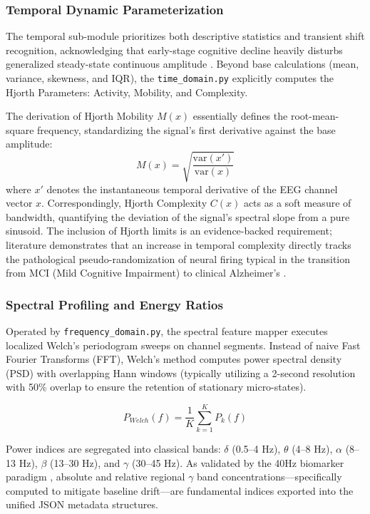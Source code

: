 \subsubsection{Temporal Dynamic Parameterization}
The temporal sub-module prioritizes both descriptive statistics and transient shift recognition, acknowledging that early-stage cognitive decline heavily disturbs generalized steady-state continuous amplitude \cite{jeong2004eeg}. Beyond base calculations (mean, variance, skewness, and IQR), the \texttt{time\_domain.py} explicitly computes the Hjorth Parameters: Activity, Mobility, and Complexity.

The derivation of Hjorth Mobility $M(x)$ essentially defines the root-mean-square frequency, standardizing the signal's first derivative against the base amplitude:
\begin{equation}
    M(x) = \sqrt{\frac{\text{var}(x')}{\text{var}(x)}}
\end{equation}
where $x'$ denotes the instantaneous temporal derivative of the EEG channel vector $x$. 
Correspondingly, Hjorth Complexity $C(x)$ acts as a soft measure of bandwidth, quantifying the deviation of the signal's spectral slope from a pure sinusoid. The inclusion of Hjorth limits is an evidence-backed requirement; literature demonstrates that an increase in temporal complexity directly tracks the pathological pseudo-randomization of neural firing typical in the transition from MCI (Mild Cognitive Impairment) to clinical Alzheimer's \cite{cassani2020review}.

\subsubsection{Spectral Profiling and Energy Ratios}
Operated by \texttt{frequency\_domain.py}, the spectral feature mapper executes localized Welch's periodogram sweeps on channel segments. Instead of naive Fast Fourier Transforms (FFT), Welch's method computes power spectral density (PSD) with overlapping Hann windows (typically utilizing a 2-second resolution with 50\% overlap to ensure the retention of stationary micro-states).

\begin{equation}
    P_{Welch}(f) = \frac{1}{K} \sum_{k=1}^{K} P_k(f)
\end{equation}

Power indices are segregated into classical bands: $\delta$ (0.5--4 Hz), $\theta$ (4--8 Hz), $\alpha$ (8--13 Hz), $\beta$ (13--30 Hz), and $\gamma$ (30--45 Hz). As validated by the 40Hz biomarker paradigm \cite{martorell2019gamma}, absolute and relative regional $\gamma$ band concentrations—specifically computed to mitigate baseline drift—are fundamental indices exported into the unified JSON metadata structures.

